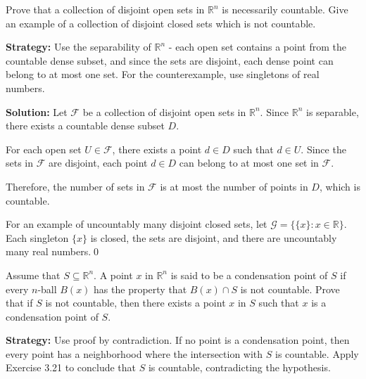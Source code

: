 \begin{problembox}
\begin{problemstatement}
Prove that a collection of disjoint open sets in \( \mathbb{R}^n \) is necessarily countable. Give an example of a collection of disjoint closed sets which is not countable.
\end{problemstatement}
\end{problembox}

\noindent\textbf{Strategy:} Use the separability of $\mathbb{R}^n$ - each open set contains a point from the countable dense subset, and since the sets are disjoint, each dense point can belong to at most one set. For the counterexample, use singletons of real numbers.

\bigskip\noindent\textbf{Solution:} Let $\mathcal{F}$ be a collection of disjoint open sets in $\mathbb{R}^n$. Since $\mathbb{R}^n$ is separable, there exists a countable dense subset $D$.

For each open set $U \in \mathcal{F}$, there exists a point $d \in D$ such that $d \in U$. Since the sets in $\mathcal{F}$ are disjoint, each point $d \in D$ can belong to at most one set in $\mathcal{F}$.

Therefore, the number of sets in $\mathcal{F}$ is at most the number of points in $D$, which is countable.

For an example of uncountably many disjoint closed sets, let $\mathcal{G} = \{\{x\} : x \in \mathbb{R}\}$. Each singleton $\{x\}$ is closed, the sets are disjoint, and there are uncountably many real numbers.\qed


\begin{problembox}
\begin{problemstatement}
Assume that \( S \subseteq \mathbb{R}^n \). A point \( x \) in \( \mathbb{R}^n \) is said to be a condensation point of \( S \) if every \( n \)-ball \( B(x) \) has the property that \( B(x) \cap S \) is not countable. Prove that if \( S \) is not countable, then there exists a point \( x \) in \( S \) such that \( x \) is a condensation point of \( S \).
\end{problemstatement}
\end{problembox}

\noindent\textbf{Strategy:} Use proof by contradiction. If no point is a condensation point, then every point has a neighborhood where the intersection with $S$ is countable. Apply Exercise 3.21 to conclude that $S$ is countable, contradicting the hypothesis.

